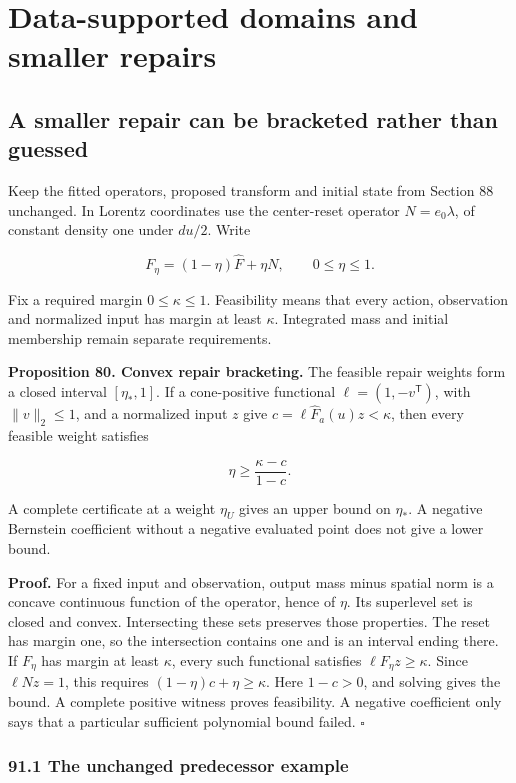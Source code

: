 \chapter{Data-supported domains and smaller repairs}\label{LSM:book:chapter-38}
\section{A smaller repair can be bracketed rather than guessed}\label{LSM:a-smaller-repair-can-be-bracketed-rather-than-guessed}

Keep the fitted operators, proposed transform and initial state from
Section 88 unchanged. In Lorentz coordinates use the center-reset
operator \(N=e_0\lambda\), of constant density one under \(du/2\). Write

\[
F_\eta=(1-\eta)\widehat F+\eta N,
\qquad 0\leq\eta\leq1.
\]

Fix a required margin \(0\leq\kappa\leq1\). Feasibility means that every
action, observation and normalized input has margin at least \(\kappa\).
Integrated mass and initial membership remain separate requirements.

\textbf{Proposition 80. Convex repair bracketing.} The feasible repair
weights form a closed interval \([\eta_*,1]\). If a cone-positive
functional \(\ell=(1,-v^{\mathsf T})\), with \(\|v\|_2\leq1\), and a
normalized input \(z\) give \(c=\ell\widehat F_a(u)z<\kappa\), then
every feasible weight satisfies

\[
\boxed{\eta\geq\frac{\kappa-c}{1-c}.}
\]

A complete certificate at a weight \(\eta_U\) gives an upper bound on
\(\eta_*\). A negative Bernstein coefficient without a negative
evaluated point does not give a lower bound.

\textbf{Proof.} For a fixed input and observation, output mass minus
spatial norm is a concave continuous function of the operator, hence of
\(\eta\). Its superlevel set is closed and convex. Intersecting these
sets preserves those properties. The reset has margin one, so the
intersection contains one and is an interval ending there. If \(F_\eta\)
has margin at least \(\kappa\), every such functional satisfies
\(\ell F_\eta z\geq\kappa\). Since \(\ell Nz=1\), this requires
\((1-\eta)c+\eta\geq\kappa\). Here \(1-c>0\), and solving gives the
bound. A complete positive witness proves feasibility. A negative
coefficient only says that a particular sufficient polynomial bound
failed. \(\square\)

\subsection{91.1 The unchanged predecessor
example}\label{LSM:the-unchanged-predecessor-example}


